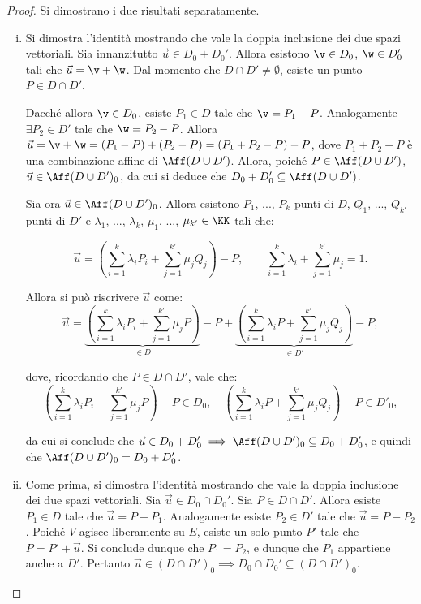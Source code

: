 \documentclass[11pt]{article}
\begin{document}
	\begin{proof}
		Si dimostrano i due risultati separatamente.

		\begin{enumerate}[(i)]
			\item Si dimostra l'identità mostrando che vale la doppia inclusione dei due spazi vettoriali.
			Sia innanzitutto $\vec u \in D_0 + D_0'$. Allora esistono $\v \in D_0$, $\w \in D_0'$ tali che
			$\vec u = \v + \w$. Dal momento che $D \cap D' \neq \emptyset$, esiste un punto $P \in D \cap D'$.
			
			Dacché allora $\v \in D_0$, esiste $P_1 \in D$ tale che $\v = P_1 - P$. Analogamente $\exists P_2 \in D'$
			tale che $\w = P_2 - P$. Allora $\vec u = \v + \w = (P_1 - P) + (P_2 - P) = (P_1 + P_2 - P) - P$,
			dove $P_1 + P_2 - P$ è una combinazione affine di $\Aff(D \cup D')$. Allora, poiché $P \in \Aff(D \cup D')$,
			$\vec u \in \Aff(D \cup D')_0$, da cui si deduce che $D_0 + D_0' \subseteq \Aff(D \cup D')$.
			
			Sia ora $\vec u \in \Aff(D \cup D')_0$. Allora esistono $P_1$, ..., $P_k$ punti di $D$, $Q_1$, ..., $Q_{k'}$
			punti di $D'$ e $\lambda_1$, ..., $\lambda_k$, $\mu_1$, ..., $\mu_{k'} \in \KK$ tali che:
			
			\[ \vec u = \left( \sum_{i=1}^k \lambda_i P_i + \sum_{j=1}^{k'} \mu_j Q_j \right) - P, \qquad \sum_{i=1}^k \lambda_i + \sum_{j=1}^{k'} \mu_j = 1. \]
			
			\vskip 0.05in
			
			Allora si può riscrivere $\vec u$ come:
			\[ \vec u =  \underbrace{\left(\sum_{i=1}^k \lambda_i P_i + \sum_{j=1}^{k'} \mu_j P\right)}_{\in D}  - P +  \underbrace{\left(\sum_{i=1}^k \lambda_i P + \sum_{j=1}^{k'} \mu_j Q_j\right)}_{\in D'} - P, \]
			
			dove, ricordando che $P \in D \cap D'$, vale che:
			\[ \left(\sum_{i=1}^k \lambda_i P_i + \sum_{j=1}^{k'} \mu_j P\right)  - P \in D_0, \quad 
			\left(\sum_{i=1}^k \lambda_i P + \sum_{j=1}^{k'} \mu_j Q_j\right) - P \in D'_0, \]
			
			da cui si conclude che $\vec u \in D_0 + D_0' \implies \Aff(D \cup D')_0 \subseteq D_0 + D'_0$,
			e quindi che $\Aff(D \cup D')_0 = D_0 + D'_0$.
			
			\item Come prima, si dimostra l'identità mostrando che vale la doppia inclusione dei due
			spazi vettoriali. Sia $\vec u \in D_0 \cap D_0'$. Sia $P \in D \cap D'$. Allora esiste $P_1 \in D$
			tale che $\vec u = P - P_1$. Analogamente esiste $P_2 \in D'$ tale che $\vec u = P - P_2$. Poiché
			$V$ agisce liberamente su $E$, esiste un solo punto $P'$ tale che $P = P' + \vec u$. Si conclude dunque
			che $P_1 = P_2$, e dunque che $P_1$ appartiene anche a $D'$. Pertanto $\vec u \in (D \cap D')_0 \implies
			D_0 \cap D_0' \subseteq (D \cap D')_0$.
			

\end{enumerate}
\end{proof}
\end{document}
